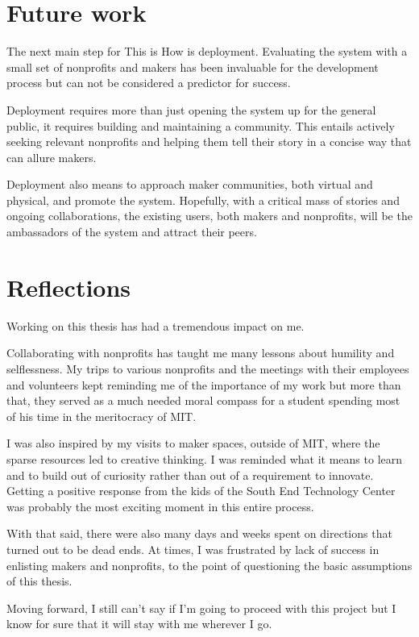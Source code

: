 \section{Future work}

The next main step for This is How is deployment. Evaluating the system with a small set of nonprofits and makers has been invaluable for the development process but can not be considered a predictor for success.

Deployment requires more than just opening the system up for the general public, it requires building and maintaining a community. This entails actively seeking relevant nonprofits and helping them tell their story in a concise way that can allure makers. 

Deployment also means to approach maker communities, both virtual and physical, and promote the system. Hopefully, with a critical mass of stories and ongoing collaborations, the existing users, both makers and nonprofits, will be the ambassadors of the system and attract their peers.

\section{Reflections}

Working on this thesis has had a tremendous impact on me.

Collaborating with nonprofits has taught me many lessons about humility and selflessness. My trips to various nonprofits and the meetings with their employees and volunteers kept reminding me of the importance of my work but more than that, they served as a much needed moral compass for a student spending most of his time in the meritocracy of MIT.

I was also inspired by my visits to maker spaces, outside of MIT, where the sparse resources led to creative thinking. I was reminded what it means to learn and to build out of curiosity rather than out of a requirement to innovate. Getting a positive response from the kids of the South End Technology Center was probably the most exciting moment in this entire process.

With that said, there were also many days and weeks spent on directions that turned out to be dead ends. At times, I was frustrated by lack of success in enlisting makers and nonprofits, to the point of questioning the basic assumptions of this thesis.

Moving forward, I still can't say if I'm going to proceed with this project but I know for sure that it will stay with me wherever I go.